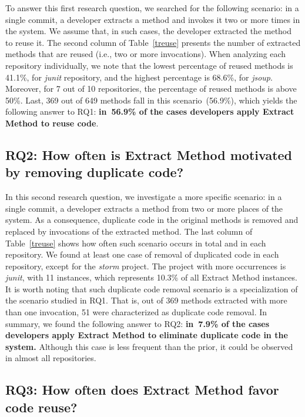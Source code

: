 To answer this first research question, we searched for the following scenario: in a single commit, a developer extracts a method and invokes it two or more times in the system. We assume that, in such cases, the developer extracted the method to reuse it.
The second column of Table~\ref{treuse} presents the number of extracted methods that are reused (i.e., two or more invocations).
When analyzing each repository individually, we note that the lowest percentage of reused methods is 41.1\%, for \textit{junit} repository, and the highest percentage is 68.6\%, for \textit{jsoup}. Moreover, for 7 out of 10 repositories, the percentage of reused methods is above 50\%.
Last, 369 out of 649 methods fall in this scenario~(56.9\%), which yields the following answer to RQ1: \textbf{in~56.9\% of the cases developers apply Extract Method to reuse code}.


\subsection{RQ2: How often is Extract Method motivated by removing duplicate code?}


In this second research question, we investigate a more specific scenario: in a single commit, a developer extracts a method from two or more places of the system. As a consequence, duplicate code in the original methods is removed and replaced by invocations of the extracted method.
The last column of Table~\ref{treuse} shows how often such scenario occurs in total and in each repository.
We found at least one case of removal of duplicated code in each repository, except for the \textit{storm} project. The project with more occurrences is \textit{junit}, with 11 instances, which represents 10.3\% of all Extract Method instances. 
It is worth noting that such duplicate code removal scenario is a specialization of the scenario studied in RQ1.
That is, out of 369 methods extracted with more than one invocation, 51 were characterized as duplicate code removal.
In summary, we found the following answer to RQ2:  \textbf{in~7.9\% of the cases developers apply Extract Method to eliminate duplicate code in the system.} Although this case is less frequent than the prior, it could be observed in almost all repositories.


\subsection{RQ3: How often does Extract Method favor code reuse?}

